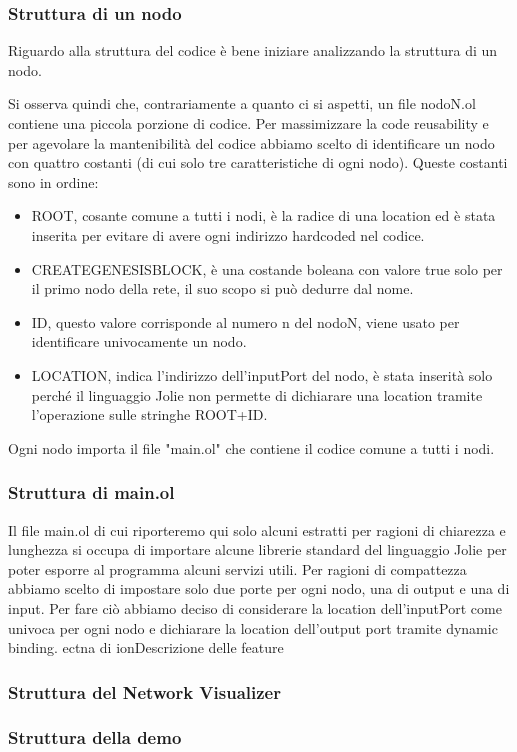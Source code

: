 \documentclass[12pt,a4paper]{article}
\begin{document}
\subsubsection{Struttura di un nodo}
Riguardo alla struttura del codice è bene iniziare analizzando la struttura di un nodo. 
%

%
Si osserva quindi che, contrariamente a quanto ci si aspetti, un file nodoN.ol contiene una piccola porzione di codice. Per massimizzare la code reusability e per agevolare la mantenibilità del codice abbiamo scelto di identificare un nodo con quattro costanti (di cui solo tre caratteristiche di ogni nodo).
Queste costanti sono in ordine:
\begin{itemize}
    \item ROOT, cosante comune a tutti i nodi, è la radice di una location ed è stata inserita per evitare di avere ogni indirizzo hardcoded nel codice.
    \item CREATEGENESISBLOCK, è una costande boleana con valore true solo per il primo nodo della rete, il suo scopo si può dedurre dal nome.
    \item ID, questo valore corrisponde al numero n del nodoN, viene usato per identificare univocamente un nodo.
    \item LOCATION, indica l'indirizzo dell'inputPort del nodo, è stata inserità solo perché il linguaggio Jolie non permette di dichiarare una location tramite l'operazione sulle stringhe ROOT+ID. 
\end{itemize}
Ogni nodo importa il file "main.ol" che contiene il codice comune a tutti i nodi.
\subsubsection{Struttura di main.ol}
Il file main.ol di cui riporteremo qui solo alcuni estratti per ragioni di chiarezza e lunghezza si occupa di importare alcune librerie standard del linguaggio Jolie per poter esporre al programma alcuni servizi utili. 
Per ragioni di compattezza abbiamo scelto di impostare solo due porte per ogni nodo, una di output e una di input. Per fare ciò abbiamo deciso di considerare la location dell'inputPort come univoca per ogni nodo e dichiarare la location dell'output port tramite dynamic binding. ectna di ion{Descrizione delle feature}
\subsubsection{Struttura del Network Visualizer}
\subsubsection{Struttura della demo}
\end{document}
